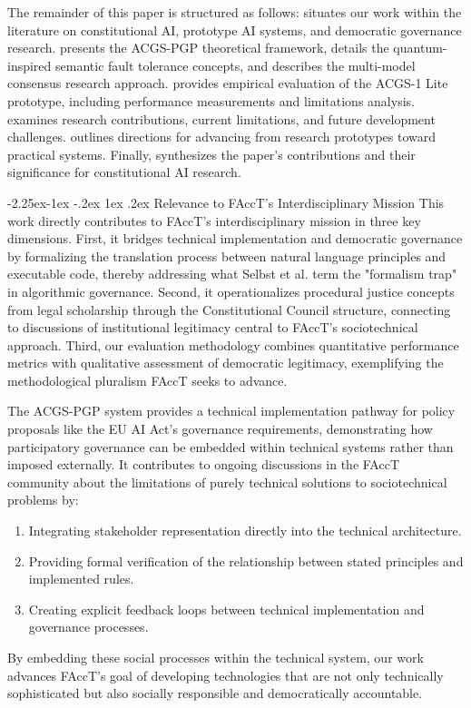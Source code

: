 \documentclass[manuscript,screen,9pt]{acmart}
\makeatletter
\renewcommand\subsection{\@startsection{subsection}{2}{\z@}%
  {-2.25ex\@plus -1ex \@minus -.2ex}%
  {1ex \@plus .2ex}%
  {\normalfont\large\bfseries}}
\makeatother
\begin{document}
The remainder of this paper is structured as follows:  situates our work within the literature on constitutional AI, prototype AI systems, and democratic governance research.  presents the ACGS-PGP theoretical framework, details the quantum-inspired semantic fault tolerance concepts, and describes the multi-model consensus research approach.  provides empirical evaluation of the ACGS-1 Lite prototype, including performance measurements and limitations analysis.  examines research contributions, current limitations, and future development challenges.  outlines directions for advancing from research prototypes toward practical systems. Finally,  synthesizes the paper's contributions and their significance for constitutional AI research.

\subsection{Relevance to FAccT's Interdisciplinary Mission}
\label{subsec:facct_relevance}
This work directly contributes to FAccT's interdisciplinary mission in three key dimensions. First, it bridges technical implementation and democratic governance by formalizing the translation process between natural language principles and executable code, thereby addressing what Selbst et al. \cite{Selbst2019FairnessAccountability} term the "formalism trap" in algorithmic governance. Second, it operationalizes procedural justice concepts from legal scholarship through the Constitutional Council structure, connecting to discussions of institutional legitimacy central to FAccT's sociotechnical approach. Third, our evaluation methodology combines quantitative performance metrics with qualitative assessment of democratic legitimacy, exemplifying the methodological pluralism FAccT seeks to advance.

The ACGS-PGP system provides a technical implementation pathway for policy proposals like the EU AI Act's governance requirements, demonstrating how participatory governance can be embedded within technical systems rather than imposed externally. It contributes to ongoing discussions in the FAccT community about the limitations of purely technical solutions to sociotechnical problems by:
\begin{enumerate}[leftmargin=*,itemsep=1pt,parsep=1pt]
	\item Integrating stakeholder representation directly into the technical architecture.
	\item Providing formal verification of the relationship between stated principles and implemented rules.
	\item Creating explicit feedback loops between technical implementation and governance processes.
\end{enumerate}
By embedding these social processes within the technical system, our work advances FAccT's goal of developing technologies that are not only technically sophisticated but also socially responsible and democratically accountable.
\end{document}
